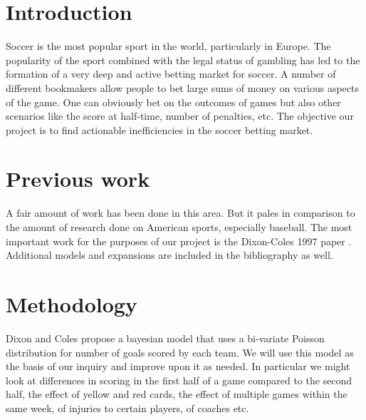 \documentclass[12pt]{article}
\begin{document}
\maketitle


\section{Introduction}
Soccer is the most popular sport in the world, particularly in Europe. The 
popularity of the sport combined with the legal status of gambling has led
to the formation of a very deep and active betting market for soccer. A
number of different bookmakers allow people to bet large sums of money 
on various aspects of the game. One can obviously bet on the outcomes
of games but also other scenarios like the score at half-time, number of 
penalties, etc. The objective our project is to find actionable inefficiencies in the 
soccer betting market. 


\section{Previous work}\label{previous work}
A fair amount of work has been done in this area. But it pales in comparison
to the amount of research done on American sports, especially baseball.
The most important work for the purposes of our project is the Dixon-Coles
1997 paper \cite{dixoncoles}. Additional models and expansions are included in the
bibliography as well. \cite{constantinou-1} \cite{constantinou-2} \cite{constantinou-3}

\section{Methodology}\label{methodology}
Dixon and Coles propose a bayesian model that uses a bi-variate Poisson 
distribution for number of goals scored by each team. We will use this model 
as the basis of our inquiry and improve upon it as needed. In particular we might 
look at  differences in scoring in the first half of a game compared to the second half, 
the effect of yellow and red cards, the effect of multiple games within the same
week, of injuries to certain players, of coaches etc.
\end{document}
